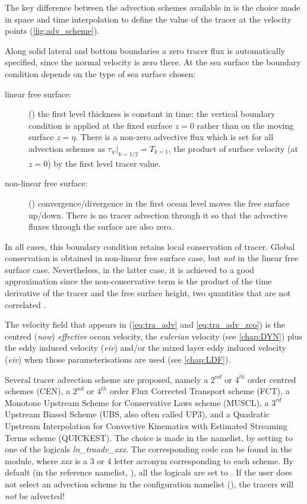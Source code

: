 \documentclass[../main/NEMO_manual]{subfiles}
\begin{document}
The key difference between the advection schemes available in \NEMO is the choice made in space and
time interpolation to define the value of the tracer at the velocity points
(\autoref{fig:adv_scheme}).

Along solid lateral and bottom boundaries a zero tracer flux is automatically specified,
since the normal velocity is zero there.
At the sea surface the boundary condition depends on the type of sea surface chosen:
\begin{description}
\item[linear free surface:]
  ()
  the first level thickness is constant in time:
  the vertical boundary condition is applied at the fixed surface $z=0$ rather than on the moving surface $z=\eta$.
  There is a non-zero advective flux which is set for all advection schemes as
  $\left. {\tau_w } \right|_{k=1/2} =T_{k=1} $,
  \ie the product of surface velocity (at $z=0$) by the first level tracer value.
\item[non-linear free surface:]
  ()
  convergence/divergence in the first ocean level moves the free surface up/down.
  There is no tracer advection through it so that the advective fluxes through the surface are also zero.
\end{description}
In all cases, this boundary condition retains local conservation of tracer.
Global conservation is obtained in non-linear free surface case, but \textit{not} in the linear free surface case.
Nevertheless, in the latter case, it is achieved to a good approximation since
the non-conservative term is the product of the time derivative of the tracer and the free surface height,
two quantities that are not correlated \citep{Roullet_Madec_JGR00,Griffies_al_MWR01,Campin2004}.

The velocity field that appears in (\autoref{eq:tra_adv} and \autoref{eq:tra_adv_zco})
is the centred (\textit{now}) \textit{effective} ocean velocity,
\ie the \textit{eulerian} velocity (see \autoref{chap:DYN}) plus
the eddy induced velocity (\textit{eiv}) and/or
the mixed layer eddy induced velocity (\textit{eiv}) when
those parameterisations are used (see \autoref{chap:LDF}).

Several tracer advection scheme are proposed, namely a $2^{nd}$ or $4^{th}$ order centred schemes (CEN),
a $2^{nd}$ or $4^{th}$ order Flux Corrected Transport scheme (FCT),
a Monotone Upstream Scheme for Conservative Laws scheme (MUSCL),
a $3^{rd}$ Upstream Biased Scheme (UBS, also often called UP3),
and a Quadratic Upstream Interpolation for Convective Kinematics with
Estimated Streaming Terms scheme (QUICKEST).
The choice is made in the \textit{} namelist,
by setting to  one of the logicals \textit{ln\_traadv\_xxx}.
The corresponding code can be found in the  module,
where \textit{xxx} is a 3 or 4 letter acronym corresponding to each scheme.
By default (\ie in the reference namelist, ), all the logicals are set to .
If the user does not select an advection scheme in the configuration namelist (),
the tracers will \textit{not} be advected!
\end{document}
